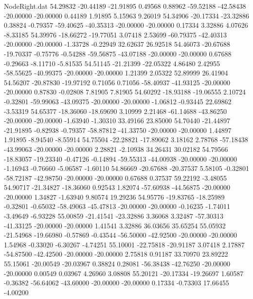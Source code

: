 \begin{filecontents}{NodeRight.dat}
  54.29832  -20.44189  -21.91895     0.49568    0.88962  -59.52188  -42.58438  -20.00000  -20.00000    0.44189    1.91895    5.15963    9.26019
  54.34906  -20.17334  -23.32886     0.38824   -0.79357  -59.40625  -40.35313  -20.00000  -20.00000    0.17334    3.32886    4.07626   -8.33185
  54.39976  -18.66272  -19.77051     3.07418    2.53699  -60.79375  -42.40313  -20.00000  -20.00000   -1.33728   -0.22949   32.62637   26.92518
  54.46073  -20.67688  -19.70337    -0.75776   -0.54288  -59.56875  -43.07188  -20.00000  -20.00000    0.67688   -0.29663   -8.11710   -5.81535
  54.51145  -21.21399  -22.05322     4.86480    2.42955  -58.55625  -40.99375  -20.00000  -20.00000    1.21399    2.05322   52.89999   26.41904
  54.56207  -20.87830  -19.97192     0.71056    0.71056  -58.40937  -41.93125  -20.00000  -20.00000    0.87830   -0.02808    7.81905    7.81905
  54.60292  -18.93188  -19.06555     2.10724   -0.32801  -59.99063  -43.09375  -20.00000  -20.00000   -1.06812   -0.93445   22.69862   -3.53319
  54.65377  -18.36060  -18.69690     3.10999    2.21468  -61.14688  -43.86250  -20.00000  -20.00000   -1.63940   -1.30310   33.49166   23.85000
  54.70440  -21.44897  -21.91895    -0.82938   -0.79357  -58.87812  -41.33750  -20.00000  -20.00000    1.44897    1.91895   -8.94540   -8.55914
  54.75504  -22.28821  -17.89062     3.18162    2.78768  -57.18438  -43.99063  -20.00000  -20.00000    2.28821   -2.10938   34.26431   30.02182
  54.79566  -18.83057  -19.23340    -0.47126   -0.14894  -59.55313  -44.00938  -20.00000  -20.00000   -1.16943   -0.76660   -5.06587   -1.60110
  54.86669  -20.67688  -20.37537     5.58105   -0.32801  -58.72187  -42.98750  -20.00000  -20.00000    0.67688    0.37537   59.22192   -3.48055
  54.90717  -21.34827  -18.36060     0.92543    1.82074  -57.60938  -44.56875  -20.00000  -20.00000    1.34827   -1.63940    9.80574   19.29236
  54.95776  -19.83765  -18.25989    -0.32801   -0.65032  -58.49063  -45.47813  -20.00000  -20.00000   -0.16235   -1.74011   -3.49649   -6.93228
  55.00859  -21.41541  -23.32886     3.36068    3.32487  -57.30313  -41.33125  -20.00000  -20.00000    1.41541    3.32886   36.03656   35.65254
  55.05932  -21.54968  -19.66980    -0.57869   -0.43544  -56.50000  -42.92500  -20.00000  -20.00000    1.54968   -0.33020   -6.30267   -4.74251
  55.10001  -22.75818  -20.91187     3.07418    2.17887  -54.87500  -42.42500  -20.00000  -20.00000    2.75818    0.91187   33.70970   23.89222
  55.15061  -20.00549  -20.03967     0.38824    0.28081  -56.38438  -42.76250  -20.00000  -20.00000    0.00549    0.03967    4.26960    3.08808
  55.20121  -20.17334  -19.26697     1.60587   -0.36382  -56.64062  -43.60000  -20.00000  -20.00000    0.17334   -0.73303   17.66455   -4.00200

\end{filecontents}
